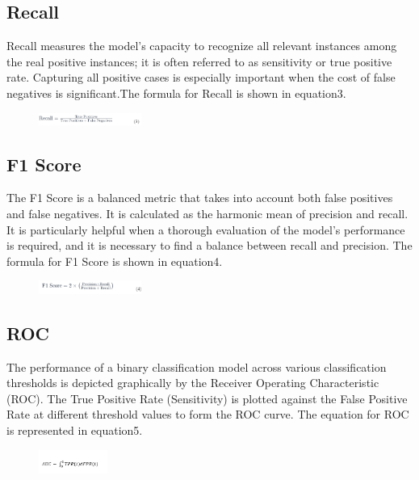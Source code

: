  \subsection{Recall}
 Recall measures the model's capacity to recognize all relevant instances among the real positive instances; it is often referred to as sensitivity or true positive rate. Capturing all positive cases is especially important when the cost of false negatives is significant.The formula for Recall is shown in equation3.

 
  \begin{figure}[h]
    \centering
    \includegraphics[width=0.3\textwidth]{Recall.png}
\end{figure}


 \subsection{F1 Score}
 The F1 Score is a balanced metric that takes into account both false positives and false negatives. It is calculated as the harmonic mean of precision and recall. It is particularly helpful when a thorough evaluation of the model's performance is required, and it is necessary to find a balance between recall and precision. The formula for F1 Score is shown in equation4.
 \begin{figure}[h]
    \centering
    \includegraphics[width=0.3\textwidth]{Screenshot 2023-12-11 020322.png}
\end{figure}
 
\subsection{ROC}
The performance of a binary classification model across various classification thresholds is depicted graphically by the Receiver Operating Characteristic (ROC). The True Positive Rate (Sensitivity) is plotted against the False Positive Rate at different threshold values to form the ROC curve. The equation for ROC is represented in equation5.

\begin{figure}[h]
    \centering
    \includegraphics[width=0.2\textwidth]{Screenshot (195).png}
   
\end{figure}

